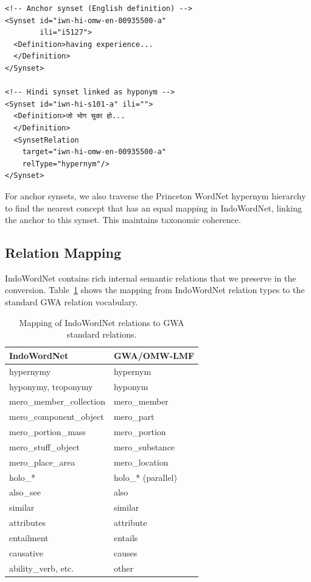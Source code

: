 \documentclass[11pt]{article}
\begin{document}
\begin{verbatim}
<!-- Anchor synset (English definition) -->
<Synset id="iwn-hi-omw-en-00935500-a" 
        ili="i5127">
  <Definition>having experience...
  </Definition>
</Synset>

<!-- Hindi synset linked as hyponym -->
<Synset id="iwn-hi-s101-a" ili="">
  <Definition>जो भोग चुका हो...
  </Definition>
  <SynsetRelation 
    target="iwn-hi-omw-en-00935500-a" 
    relType="hypernym"/>
</Synset>
\end{verbatim}

For anchor synsets, we also traverse the Princeton WordNet hypernym hierarchy to find the nearest concept that has an equal mapping in IndoWordNet, linking the anchor to this synset.
This maintains taxonomic coherence.

\subsection{Relation Mapping}

IndoWordNet contains rich internal semantic relations that we preserve in the conversion.
Table~\ref{tab:relation-mapping} shows the mapping from IndoWordNet relation types to the standard GWA relation vocabulary.

\begin{table}[t]
\centering
\small
\begin{tabular}{ll}
\toprule
\textbf{IndoWordNet} & \textbf{GWA/OMW-LMF} \\
\midrule
hypernymy & hypernym \\
hyponymy, troponymy & hyponym \\
mero\_member\_collection & mero\_member \\
mero\_component\_object & mero\_part \\
mero\_portion\_mass & mero\_portion \\
mero\_stuff\_object & mero\_substance \\
mero\_place\_area & mero\_location \\
holo\_* & holo\_* (parallel) \\
also\_see & also \\
similar & similar \\
attributes & attribute \\
entailment & entails \\
causative & causes \\
ability\_verb, etc. & other \\
\bottomrule
\end{tabular}
\caption{Mapping of IndoWordNet relations to GWA standard relations.}
\label{tab:relation-mapping}
\end{table}
\end{document}
